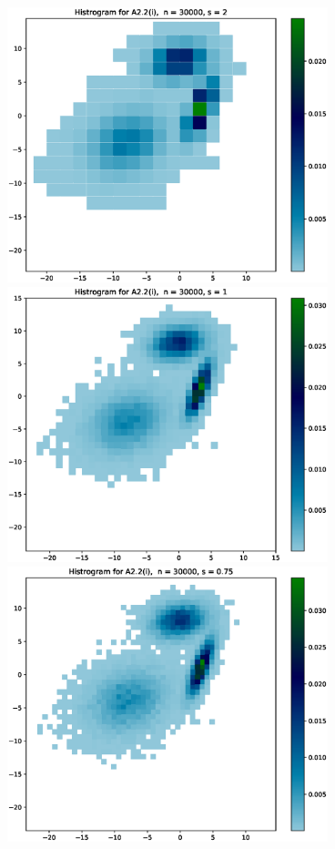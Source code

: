 \documentclass{article}
\begin{document}
\includegraphics[height=8cm]{Figures_for_A2.2_i//2.eps}\\
\hspace*{-1.5cm}\includegraphics[height=8cm]{Figures_for_A2.2_i//3.eps} \hspace*{-1.5cm}
\includegraphics[height=8cm]{Figures_for_A2.2_i//4.eps}\\
\end{document}
